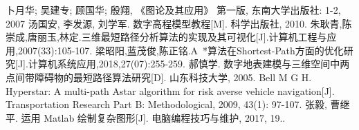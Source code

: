 \cleardoublepage{}
{}
\begin{thebibliography}{00}
   卜月华; 吴建专; 顾国华; 殷翔, 《图论及其应用》 第一版, 东南大学出版社: 1-2, 2007
   汤国安, 李发源, 刘学军. 数字高程模型教程[M]. 科学出版社, 2010.
   朱耿青,陈崇成,唐丽玉,林定.三维最短路径分析算法的实现及其可视化[J].计算机工程与应用,2007(33):105-107.
   梁昭阳,蓝茂俊,陈正铭.A~*算法在Shortest-Path方面的优化研究[J].计算机系统应用,2018,27(07):255-259.
   郝慎学. 数字地表建模与三维空间中两点间带障碍物的最短路径算法研究[D]. 山东科技大学, 2005.
   Bell M G H. Hyperstar: A multi-path Astar algorithm for risk averse vehicle navigation[J]. Transportation Research Part B: Methodological, 2009, 43(1): 97-107.
   张毅, 曹继平. 运用 Matlab 绘制复杂图形[J]. 电脑编程技巧与维护, 2017, 19..
\end{thebibliography}